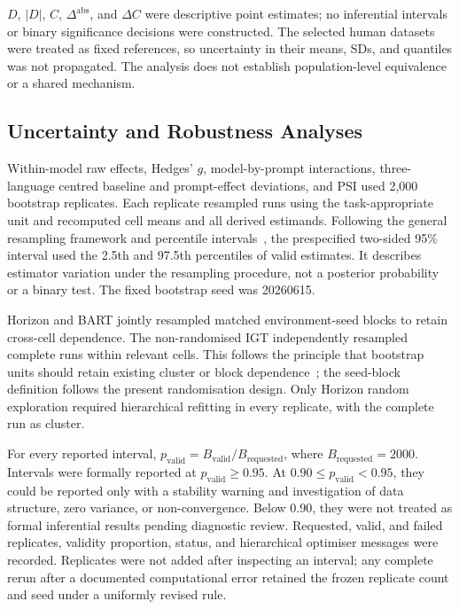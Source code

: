 \documentclass[logo,msc]{infthesis}
\begin{document}
$D$, $|D|$, $C$, $\Delta^{\mathrm{abs}}$, and $\Delta C$ were descriptive point estimates; no inferential intervals or binary significance decisions were constructed. The selected human datasets were treated as fixed references, so uncertainty in their means, SDs, and quantiles was not propagated. The analysis does not establish population-level equivalence or a shared mechanism.

\subsection{Uncertainty and Robustness Analyses}

Within-model raw effects, Hedges' $g$, model-by-prompt interactions, three-language centred baseline and prompt-effect deviations, and PSI used 2,000 bootstrap replicates. Each replicate resampled runs using the task-appropriate unit and recomputed cell means and all derived estimands. Following the general resampling framework and percentile intervals~\cite{EfronTibshirani1993Bootstrap}, the prespecified two-sided 95\% interval used the 2.5th and 97.5th percentiles of valid estimates. It describes estimator variation under the resampling procedure, not a posterior probability or a binary test. The fixed bootstrap seed was 20260615.

Horizon and BART jointly resampled matched environment-seed blocks to retain cross-cell dependence. The non-randomised IGT independently resampled complete runs within relevant cells. This follows the principle that bootstrap units should retain existing cluster or block dependence~\cite{FieldWelsh2007ClusteredBootstrap}; the seed-block definition follows the present randomisation design. Only Horizon random exploration required hierarchical refitting in every replicate, with the complete run as cluster.

For every reported interval, $p_{\mathrm{valid}}=B_{\mathrm{valid}}/B_{\mathrm{requested}}$, where $B_{\mathrm{requested}}=2000$. Intervals were formally reported at $p_{\mathrm{valid}}\geq0.95$. At $0.90\leq p_{\mathrm{valid}}<0.95$, they could be reported only with a stability warning and investigation of data structure, zero variance, or non-convergence. Below 0.90, they were not treated as formal inferential results pending diagnostic review. Requested, valid, and failed replicates, validity proportion, status, and hierarchical optimiser messages were recorded. Replicates were not added after inspecting an interval; any complete rerun after a documented computational error retained the frozen replicate count and seed under a uniformly revised rule.
\end{document}
